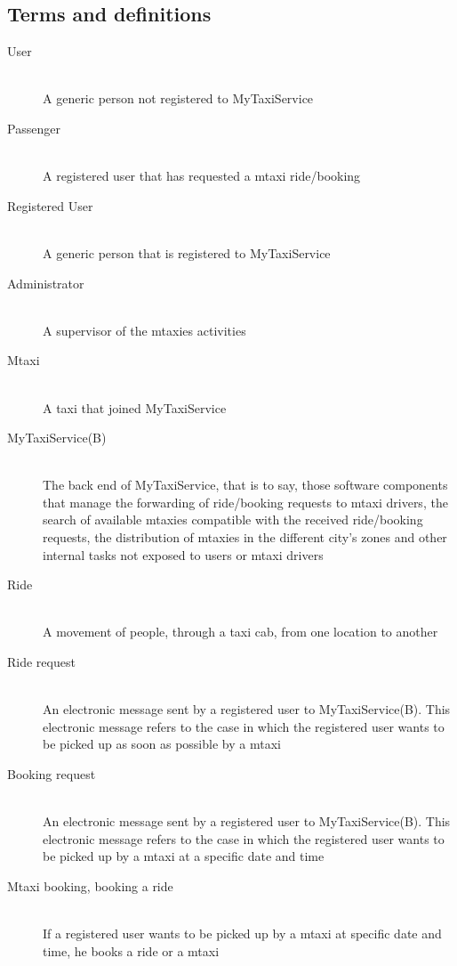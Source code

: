 \documentclass[11pt,titlepage]{article} %
\begin{document}
  \subsection{Terms and definitions}
	\begin{description}
	      \item [User] \hfill \\A generic person not registered to MyTaxiService
	      \item [Passenger] \hfill \\ A registered user that has requested a mtaxi ride/booking
	      \item [Registered User] \hfill \\ A generic person that is registered to MyTaxiService
	      \item [Administrator] \hfill \\ A supervisor of the mtaxies activities
	      \item [Mtaxi] \hfill \\ A taxi that joined MyTaxiService
	      \item [MyTaxiService(B)] \hfill \\ The back end of MyTaxiService, that is to say, those software components
	        that manage the forwarding of ride/booking requests to mtaxi drivers, the search of available mtaxies compatible with the received ride/booking requests, the distribution
	        of mtaxies in the different city's zones and other internal tasks not exposed to users or mtaxi drivers
	      \item[Ride] \hfill \\ A movement of people, through a taxi cab, from one location to another
	      \item [Ride request] \hfill \\ An electronic message sent by a registered user
	        to MyTaxiService(B). This electronic message refers to the case in which the registered user wants to be picked up as soon as possible by a mtaxi
	      \item[Booking request]\hfill \\ An electronic message sent by a registered user
	         to MyTaxiService(B). This electronic message refers to the case in which the registered user wants to be picked up by a mtaxi at a specific date and time
	      \item[Mtaxi booking, booking a ride] \hfill\\If a registered user wants to be picked up by a mtaxi at specific date and time, he books a ride or a mtaxi

\end{description}
\end{document}
